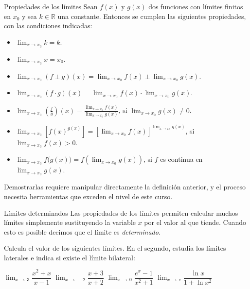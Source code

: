 \begin{definicion}{Propiedades de los límites}
Sean $f(x)$ y $g(x)$ dos funciones con límites finitos en $x_0$ y sea $k\in\mathbb{R}$ una constante. Entonces se cumplen las siguientes propiedades, con las condiciones indicadas:
\begin{itemize}
    \item[\pr{L1.}] $\displaystyle\lim_{x\to x_0}k=k$.
    \item[\pr{L2.}] $\displaystyle\lim_{x\to x_0}x=x_0$.
    \item[\pr{L3.}] $\displaystyle\lim_{x\to x_0}(f\pm g)(x)=\lim_{x\to x_0}f(x)\pm\lim_{x\to x_0}g(x)$.
    \item[\pr{L4.}] $\displaystyle\lim_{x\to x_0}(f\cdot g)(x)=\lim_{x\to x_0}f(x)\cdot\lim_{x\to x_0}g(x)$.
    \item[\pr{L5.}] $\displaystyle\lim_{x\to x_0}\left(\frac fg\right)(x)=\frac{\displaystyle\lim_{x\to x_0}f(x)}{\displaystyle\lim_{x\to x_0}g(x)}$, si $\displaystyle\lim_{x\to x_0}g(x)\ne0$.
    \item[\pr{L6.}] $\displaystyle\lim_{x\to x_0}\left[f(x)^{g(x)}\right]=\left[\lim_{x\to x_0}f(x)\right]^{\displaystyle\lim_{x\to x_0}g(x)}$, si $\displaystyle\lim_{x\to x_0}f(x)>0$.
    \item[\pr{L7.}] $\displaystyle\lim_{x\to x_0}f\bigl(g(x)\bigr)=f\left(\lim_{x\to x_0}g(x)\right)$, si $f$ es continua en $\displaystyle\lim_{x\to x_0}g(x)$.
\end{itemize}
Demostrarlas requiere manipular directamente la definición anterior, y el proceso necesita herramientas que exceden el nivel de este curso.
\end{definicion}

\begin{definicion}{Límites determinados}
Las propiedades de los límites permiten calcular muchos límites simplemente sustituyendo la variable $x$ por el valor al que tiende. Cuando esto es posible decimos que el límite es \emph{determinado}.
\end{definicion}

\begin{ejemplo}{
Calcula el valor de los siguientes límites. En el segundo, estudia los límites laterales e indica si existe el límite bilateral:
\begin{apartadosc}
 \ap $\displaystyle{\lim_{x\,\to\,3}\dfrac{x^2+x}{x-1}}$
 \ap $\displaystyle{\lim_{x\,\to\,-2}\dfrac{x+3}{x+2}}$
 \ap $\displaystyle{\lim_{x\,\to\,0}\dfrac{e^x-1}{x^2+1}}$
 \ap $\displaystyle{\lim_{x\,\to\,e}\dfrac{\ln{x}}{1+\ln{x^2}}}$
\end{apartadosc}
}
\end{ejemplo}

